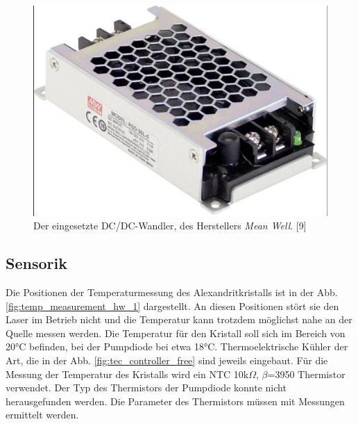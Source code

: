 \begin{figure}[H]
    \centering
    \includegraphics[scale=0.2, trim={2mm 2mm 2mm 2mm}, clip]{98_images/mean_well_dc_dc_converter.PNG}  
    \caption{Der eingesetzte DC/DC-Wandler, des Herstellers \textit{Mean Well}. [9]}
    \label{fig:dc_dc_wandler_hw}
\end{figure}

\subsection{Sensorik}
Die Positionen der Temperaturmessung des Alexandritkristalls ist in der Abb.\ref{fig:temp_measurement_hw_1} dargestellt. An diesen Positionen stört sie den Laser im Betrieb nicht und die Temperatur kann trotzdem möglichst nahe an der Quelle messen werden. Die Temperatur für den Kristall soll sich im Bereich von 20°C befinden, bei der Pumpdiode bei etwa 18°C. Thermoelektrische Kühler der Art, die in der Abb. \ref{fig:tec_controller_free} sind jeweils eingebaut. Für die Messung der Temperatur des Kristalls wird ein NTC 10k$\Omega$, $\beta$=3950 Thermistor verwendet. Der Typ des Thermistors der Pumpdiode konnte nicht herausgefunden werden. Die Parameter des Thermistors müssen mit Messungen ermittelt werden.\\

